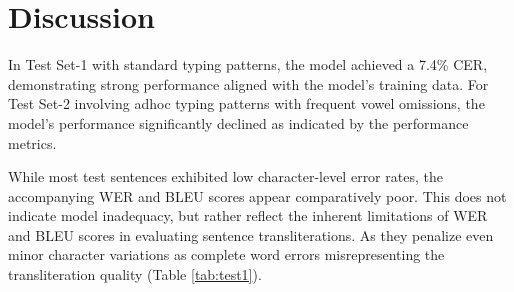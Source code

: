 \documentclass[11pt]{article}
\begin{document}








\vspace{-.2cm}

\section{Discussion}

\vspace{-.2cm}


In Test Set-1 with standard typing patterns, the model achieved a 7.4\% CER, demonstrating strong performance aligned with the model's training data. For Test Set-2 involving adhoc typing patterns with frequent vowel omissions, the model's performance significantly declined as indicated by the performance metrics.

While most test sentences exhibited low character-level error rates, the accompanying WER and BLEU scores appear comparatively poor. This does not indicate model inadequacy, but rather reflect the inherent limitations of WER and BLEU scores in evaluating sentence transliterations. As they penalize even minor character variations as complete word errors misrepresenting the transliteration quality \cite{james2024advocating} (Table \ref{tab:test1}).  
\end{document}
